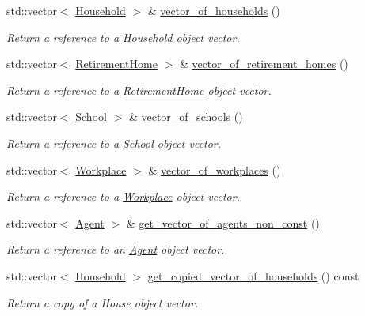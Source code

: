 \begin{DoxyCompactItemize}
std\+::vector$<$ \hyperlink{classHousehold}{Household} $>$ \& \hyperlink{classABM_ab8340f988fa5a0bbfad783b04b2f86cf}{vector\+\_\+of\+\_\+households} ()
\begin{DoxyCompactList}\small\item\em Return a reference to a \hyperlink{classHousehold}{Household} object vector. \end{DoxyCompactList}\item 
std\+::vector$<$ \hyperlink{classRetirementHome}{Retirement\+Home} $>$ \& \hyperlink{classABM_a8bcde147b1d1fbb81edcc0e9f7c717ae}{vector\+\_\+of\+\_\+retirement\+\_\+homes} ()
\begin{DoxyCompactList}\small\item\em Return a reference to a \hyperlink{classRetirementHome}{Retirement\+Home} object vector. \end{DoxyCompactList}\item 
std\+::vector$<$ \hyperlink{classSchool}{School} $>$ \& \hyperlink{classABM_a2a30709478a547ede2207ffd51070fff}{vector\+\_\+of\+\_\+schools} ()
\begin{DoxyCompactList}\small\item\em Return a reference to a \hyperlink{classSchool}{School} object vector. \end{DoxyCompactList}\item 
std\+::vector$<$ \hyperlink{classWorkplace}{Workplace} $>$ \& \hyperlink{classABM_a3ae1ff992b82308e3b1ea5a0372f4d96}{vector\+\_\+of\+\_\+workplaces} ()
\begin{DoxyCompactList}\small\item\em Return a reference to a \hyperlink{classWorkplace}{Workplace} object vector. \end{DoxyCompactList}\item 
std\+::vector$<$ \hyperlink{classAgent}{Agent} $>$ \& \hyperlink{classABM_a5a58ed2717810317bc8fe8df841dcf08}{get\+\_\+vector\+\_\+of\+\_\+agents\+\_\+non\+\_\+const} ()
\begin{DoxyCompactList}\small\item\em Return a reference to an \hyperlink{classAgent}{Agent} object vector. \end{DoxyCompactList}\item 
std\+::vector$<$ \hyperlink{classHousehold}{Household} $>$ \hyperlink{classABM_a6f87856440b00d062ff33c80ff40717b}{get\+\_\+copied\+\_\+vector\+\_\+of\+\_\+households} () const
\begin{DoxyCompactList}\small\item\em Return a copy of a House object vector. \end{DoxyCompactList}\item 

\end{DoxyCompactItemize}
